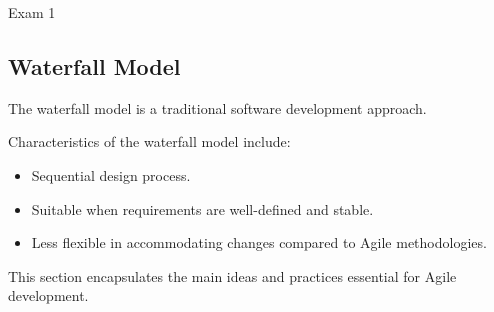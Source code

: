 \begin{examnotes}{Exam 1}
    \subsection*{Waterfall Model}
    
    The waterfall model is a traditional software development approach.
    
    \begin{highlight}
        Characteristics of the waterfall model include:
        
        \begin{itemize}
            \item Sequential design process.
            \item Suitable when requirements are well-defined and stable.
            \item Less flexible in accommodating changes compared to Agile methodologies.
        \end{itemize}
    \end{highlight}
    
    \begin{highlight}
        This section encapsulates the main ideas and practices essential for Agile development.
        

\end{highlight}
\end{examnotes}
